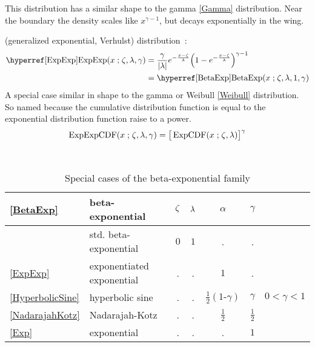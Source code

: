 This distribution has a similar shape to the gamma \eqref{Gamma} distribution. Near the boundary the density scales like $x^{\gamma-1}$, but decays exponentially in the wing.






 (generalized exponential, Verhulst) distribution~\cite{Verhulst1847,Ahuja1967,Gupta2001}:
\begin{align}
\label{ExpExp}
\opr{ExpExp}(x\given \pLoc,\pScale,\gamma) 
 &=  \frac{\gamma}{ \Left|\pScale\Right|}
 e^{- \frac{x-\pLoc}{\pScale} }  \Left(1 - e^{-\frac{x-\pLoc}{\pScale}  }\Right)^{\gamma-1} \checked
\\ & = \opr{BetaExp}(x\given \pLoc,\pScale,1, \gamma) \notag \checked
\end{align}
A special case similar in shape to the gamma or Weibull \eqref{Weibull} distribution. So named because the cumulative distribution function is equal to the exponential distribution function raise to a power.
\[
\op{ExpExpCDF}(x\given \pLoc,\pScale,\gamma) = \big[\op{ExpCDF}(x\given \pLoc,\pScale)\big]^{\gamma}
\checked
\notag
\]

\begin{table*}[bt]
\begin{center}
\caption[Beta-exponential distribution -- Special cases]{Special cases of the beta-exponential family}
~\\
{\renewcommand{\arraystretch}{1.25} 
\begin{tabular}{llccccl}
\eqref{BetaExp} & beta-exponential & $\zeta$ & $\lambda$ & $\alpha$ &  $\gamma$ \\
\hline  
 	& std. beta-exponential & $0$ & $1$ & . & . \\
\eqref{ExpExp} 		& exponentiated exponential & . & . & $1$ & . \\
\eqref{HyperbolicSine} & hyperbolic sine 	& . & .  & $\tfrac{1}{2}(1\text{-}\gamma)$ & $\gamma$ & $0<\gamma<1$ \\
\eqref{NadarajahKotz} &  Nadarajah-Kotz 	& . & . & $\tfrac{1}{2}$ & $\tfrac{1}{2}$ \\
\eqref{Exp} & exponential & . & . & . & $1$ \\
\end{tabular} }
\end{center}
\end{table*}

